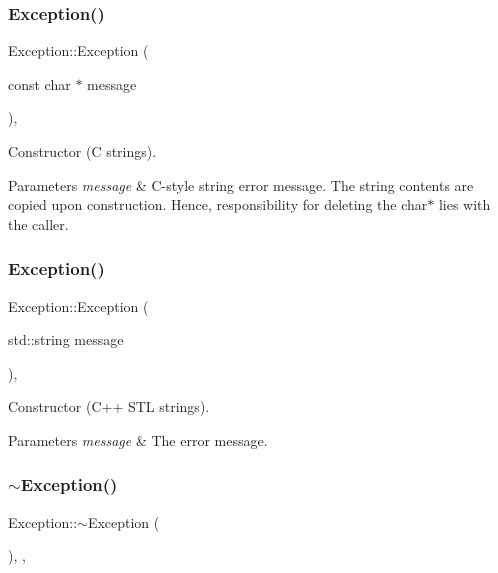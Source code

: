 \subsubsection{\texorpdfstring{Exception()}{Exception()}\hspace{0.1cm}{\footnotesize\ttfamily [1/2]}}
{\footnotesize\ttfamily Exception\+::\+Exception (\begin{DoxyParamCaption}\item[{const char $\ast$}]{message }\end{DoxyParamCaption})\hspace{0.3cm}{\ttfamily [inline]}, {\ttfamily [explicit]}}

Constructor (C strings). 
\begin{DoxyParams}{Parameters}
{\em message} & C-\/style string error message. The string contents are copied upon construction. Hence, responsibility for deleting the char$\ast$ lies with the caller. \\
\hline
\end{DoxyParams}
\mbox{\label{classException_a0b1693d4d5007815322070c907ee5cc2}} 
\subsubsection{\texorpdfstring{Exception()}{Exception()}\hspace{0.1cm}{\footnotesize\ttfamily [2/2]}}
{\footnotesize\ttfamily Exception\+::\+Exception (\begin{DoxyParamCaption}\item[{std\+::string}]{message }\end{DoxyParamCaption})\hspace{0.3cm}{\ttfamily [inline]}, {\ttfamily [explicit]}}

Constructor (C++ S\+TL strings). 
\begin{DoxyParams}{Parameters}
{\em message} & The error message. \\
\hline
\end{DoxyParams}
\mbox{\label{classException_ab834fdbc275748cf287b994503521ada}} 
\subsubsection{\texorpdfstring{$\sim$\+Exception()}{~Exception()}}
{\footnotesize\ttfamily Exception\+::$\sim$\+Exception (\begin{DoxyParamCaption}{ }\end{DoxyParamCaption})\hspace{0.3cm}{\ttfamily [override]}, {\ttfamily [default]}, {\ttfamily [noexcept]}}

